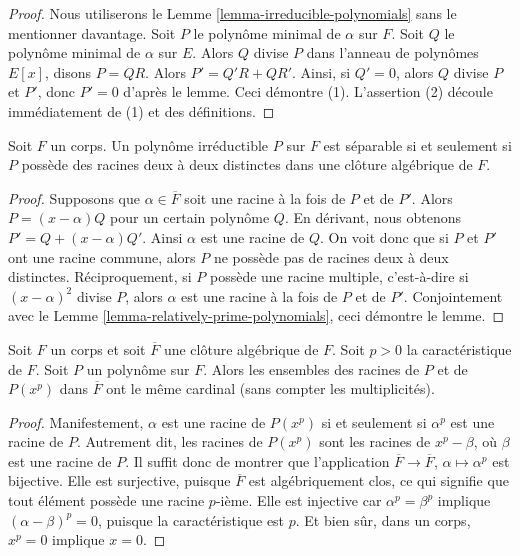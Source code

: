 \begin{proof}
Nous utiliserons le Lemme \ref{lemma-irreducible-polynomials} sans le mentionner davantage.
Soit $P$ le polynôme minimal de $\alpha$ sur $F$.
Soit $Q$ le polynôme minimal de $\alpha$ sur $E$.
Alors $Q$ divise $P$ dans l'anneau de polynômes $E[x]$, disons $P = QR$.
Alors $P' = Q'R + QR'$. Ainsi, si $Q' = 0$, alors $Q$ divise $P$ et $P'$,
donc $P' = 0$ d'après le lemme. Ceci démontre (1). L'assertion (2)
découle immédiatement de (1) et des définitions.
\end{proof}

\begin{lemma}
\label{lemma-recognize-separable}
Soit $F$ un corps. Un polynôme irréductible $P$ sur $F$
est séparable si et seulement si $P$ possède des racines deux à deux distinctes dans une
clôture algébrique de $F$.
\end{lemma}

\begin{proof}
Supposons que $\alpha \in \overline{F}$ soit une racine à la fois de $P$ et de $P'$.
Alors $P = (x - \alpha)Q$ pour un certain polynôme $Q$. En dérivant,
nous obtenons $P' = Q + (x - \alpha)Q'$. Ainsi $\alpha$ est une racine de $Q$.
On voit donc que si $P$ et $P'$ ont une racine commune, alors $P$
ne possède pas de racines deux à deux distinctes. Réciproquement, si $P$ possède
une racine multiple, c'est-à-dire si $(x - \alpha)^2$ divise $P$, alors $\alpha$
est une racine à la fois de $P$ et de $P'$. Conjointement avec le
Lemme \ref{lemma-relatively-prime-polynomials}, ceci démontre le lemme.
\end{proof}

\begin{lemma}
\label{lemma-nr-roots-unchanged}
Soit $F$ un corps et soit $\overline{F}$ une clôture algébrique de $F$.
Soit $p > 0$ la caractéristique de $F$. Soit $P$ un polynôme
sur $F$. Alors les ensembles des racines de $P$ et de $P(x^p)$ dans $\overline{F}$
ont le même cardinal (sans compter les multiplicités).
\end{lemma}

\begin{proof}
Manifestement, $\alpha$ est une racine de $P(x^p)$ si et seulement si $\alpha^p$ est une
racine de $P$. Autrement dit, les racines de $P(x^p)$ sont les racines de
$x^p - \beta$, où $\beta$ est une racine de $P$. Il suffit donc de montrer
que l'application $\overline{F} \to \overline{F}$, $\alpha \mapsto \alpha^p$
est bijective. Elle est surjective, puisque $\overline{F}$ est algébriquement clos,
ce qui signifie que tout élément possède une racine $p$-ième. Elle est injective car
$\alpha^p = \beta^p$ implique $(\alpha - \beta)^p = 0$, puisque
la caractéristique est $p$. Et bien sûr, dans un corps, $x^p = 0$ implique
$x = 0$.
\end{proof}

